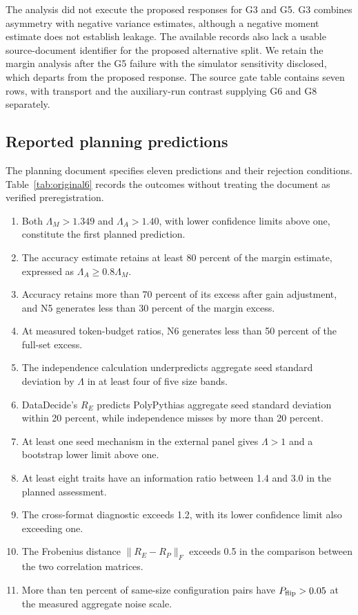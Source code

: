 The analysis did not execute the proposed responses for G3 and G5. G3 combines asymmetry with negative variance estimates, although a negative moment estimate does not establish leakage. The available records also lack a usable source-document identifier for the proposed alternative split. We retain the margin analysis after the G5 failure with the simulator sensitivity disclosed, which departs from the proposed response. The source gate table contains seven rows, with transport and the auxiliary-run contrast supplying G6 and G8 separately.

\subsection{Reported planning predictions}
The planning document specifies eleven predictions and their rejection conditions. Table~\ref{tab:original6} records the outcomes without treating the document as verified preregistration.
\begin{enumerate}
\item Both $\Lambda_M>1.349$ and $\Lambda_A>1.40$, with lower confidence limits above one, constitute the first planned prediction.
\item The accuracy estimate retains at least 80 percent of the margin estimate, expressed as $\Lambda_A\geq0.8\Lambda_M$.
\item Accuracy retains more than 70 percent of its excess after gain adjustment, and N5 generates less than 30 percent of the margin excess.
\item At measured token-budget ratios, N6 generates less than 50 percent of the full-set excess.
\item The independence calculation underpredicts aggregate seed standard deviation by $\Lambda$ in at least four of five size bands.
\item DataDecide's $R_E$ predicts PolyPythias aggregate seed standard deviation within 20 percent, while independence misses by more than 20 percent.
\item At least one seed mechanism in the external panel gives $\Lambda>1$ and a bootstrap lower limit above one.
\item At least eight traits have an information ratio between 1.4 and 3.0 in the planned assessment.
\item The cross-format diagnostic exceeds 1.2, with its lower confidence limit also exceeding one.
\item The Frobenius distance $\|R_E-R_P\|_F$ exceeds 0.5 in the comparison between the two correlation matrices.
\item More than ten percent of same-size configuration pairs have $P_{\rm flip}>0.05$ at the measured aggregate noise scale.
\end{enumerate}

